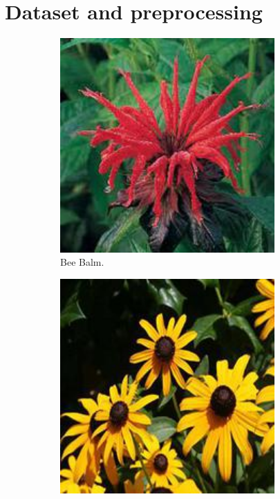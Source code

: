 \section{Dataset and preprocessing}
\label{sec:dataset}

\begin{figure}
    \centering
    \begin{subfigure}{0.24\textwidth}
        \centering
        \includegraphics[width=0.9\textwidth]{../example_images/BeeBalm.jpg}
        \caption{Bee Balm.}
    \end{subfigure}
    \vspace{0.07cm}
    \begin{subfigure}{0.24\textwidth}
        \centering
        \includegraphics[width=0.9\textwidth]{../example_images/Black-eyedSusan.jpg}

\end{subfigure}
\end{figure}
